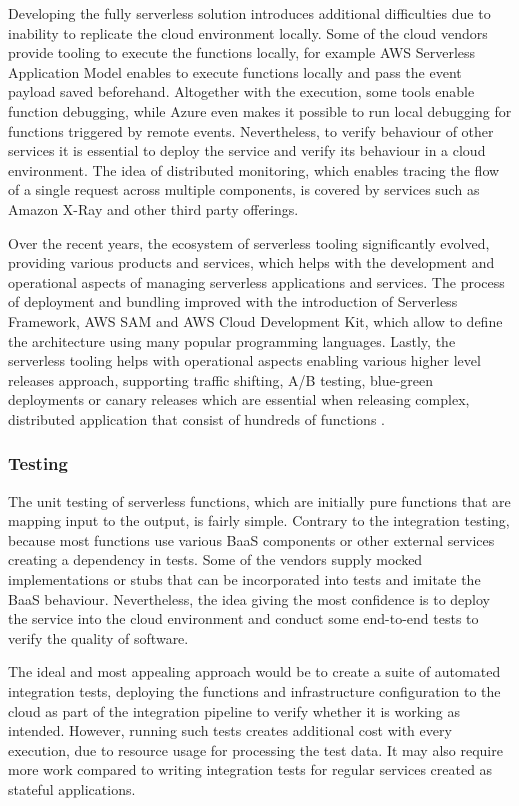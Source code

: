 Developing the fully serverless solution introduces additional difficulties due to inability to replicate the cloud environment locally. Some of the cloud vendors provide tooling to execute the functions locally, for example AWS Serverless Application Model enables to execute functions locally and pass the event payload saved beforehand. Altogether with the execution, some tools enable function debugging, while Azure even makes it possible to run local debugging for functions triggered by remote events. Nevertheless, to verify behaviour of other services it is essential to deploy the service and verify its behaviour in a cloud environment. The idea of distributed monitoring, which enables tracing the flow of a single request across multiple components, is covered by services such as Amazon X-Ray and other third party offerings.

Over the recent years, the ecosystem of serverless tooling significantly evolved, providing various products and services, which helps with the development and operational aspects of managing serverless applications and services. The process of deployment and bundling improved with the introduction of Serverless Framework, AWS SAM and AWS Cloud Development Kit, which allow to define the architecture using many popular programming languages. Lastly, the serverless tooling helps with operational aspects enabling various higher level releases approach, supporting traffic shifting, A/B testing, blue-green deployments or canary releases which are essential when releasing complex, distributed application that consist of hundreds of functions \cite{MartinFowlerServerless}.

\subsubsection{Testing} \label{chapter:serverless-testing}

The unit testing of serverless functions, which are initially pure functions that are mapping input to the output, is fairly simple. Contrary to the integration testing, because most functions use various BaaS components or other external services creating a dependency in tests. Some of the vendors supply mocked implementations or stubs that can be incorporated into tests and imitate the BaaS behaviour. Nevertheless, the idea giving the most confidence is to deploy the service into the cloud environment and conduct some end-to-end tests to verify the quality of software.

The ideal and most appealing approach would be to create a suite of automated integration tests, deploying the functions and infrastructure configuration to the cloud as part of the integration pipeline to verify whether it is working as intended. However, running such tests creates additional cost with every execution, due to resource usage for processing the test data. It may also require more work compared to writing integration tests for regular services created as stateful applications. 

